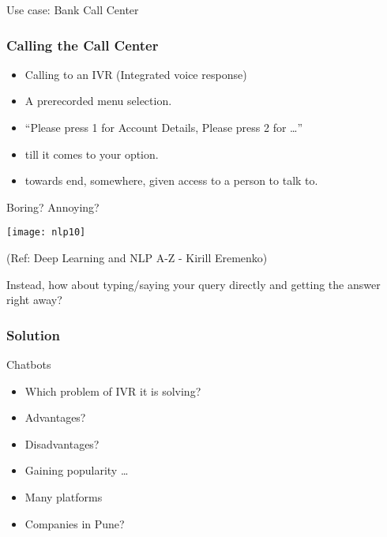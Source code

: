 \begin{frame}
  \begin{center}
    {\Large Use case: Bank Call Center}
  \end{center}
\end{frame}


\begin{frame}[fragile]\frametitle{Calling the Call Center}
	\begin{itemize}
	\item Calling to an IVR (Integrated voice response)
	\item A prerecorded menu selection.
	\item ``Please press 1 for Account Details, Please press 2 for \ldots''
	\item till it comes to your option. 
	\item towards end, somewhere, given access to a person to talk to.
	\end{itemize}

Boring? Annoying?
\begin{center}
\texttt{[image: nlp10]}

\tiny{(Ref: Deep Learning and NLP A-Z - Kirill Eremenko)}
\end{center}
Instead, how about typing/saying your query directly and getting the answer right away?

\end{frame}

\begin{frame}[fragile]\frametitle{Solution}
Chatbots

	\begin{itemize}
	\item Which problem of IVR it is solving?
	\item Advantages?
	\item Disadvantages?
	\item Gaining popularity \ldots
	\item Many platforms
	\item Companies in Pune?
	\end{itemize}


\end{frame}

